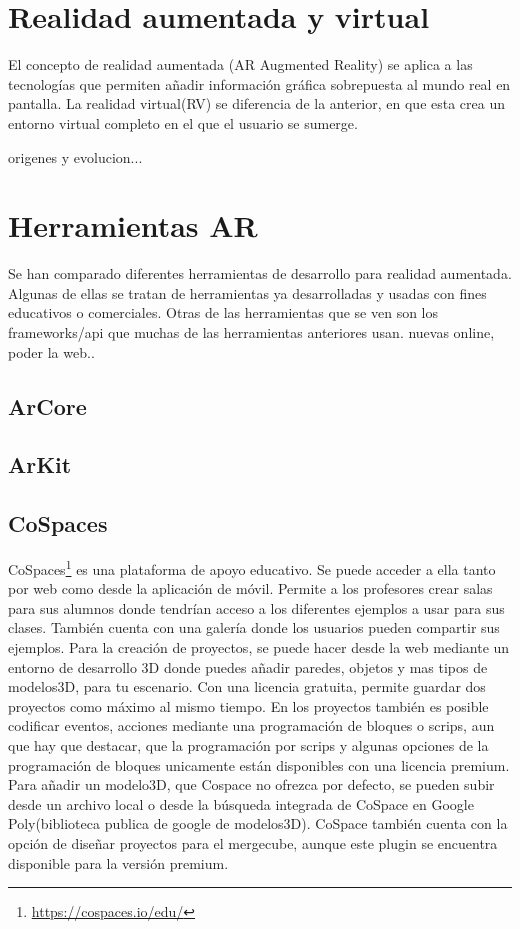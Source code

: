 

\section{Realidad aumentada y virtual}
El concepto de realidad aumentada (AR Augmented Reality) se aplica a las tecnologías que permiten añadir información gráfica sobrepuesta al mundo real en pantalla.
La realidad virtual(RV) se diferencia de la anterior, en que esta crea un entorno virtual completo en el que el usuario se sumerge.
 
origenes y evolucion...




\section{Herramientas AR}
Se han comparado diferentes herramientas de desarrollo para realidad aumentada. Algunas de ellas se tratan de herramientas ya desarrolladas y usadas con fines educativos o comerciales. Otras de las herramientas que se ven son los frameworks/api que muchas de las herramientas anteriores usan.
nuevas online, poder la web.. 

\subsection{ArCore}

\subsection{ArKit}
\subsection{CoSpaces} CoSpaces\footnote{\url{https://cospaces.io/edu/}} es una plataforma de apoyo educativo. Se puede acceder a ella tanto por web como desde la aplicación de móvil. Permite a los profesores crear salas para sus alumnos donde tendrían acceso a los diferentes ejemplos a usar para sus clases. También cuenta con una galería donde los usuarios pueden compartir sus ejemplos.
Para la creación de proyectos, se puede hacer desde la web mediante un entorno de desarrollo 3D donde puedes añadir paredes, objetos y mas tipos de modelos3D, para tu escenario. Con una licencia gratuita, permite guardar dos proyectos como máximo al mismo tiempo. En los proyectos también es posible codificar eventos, acciones mediante una programación de bloques o scrips, aun que hay que destacar, que la programación por scrips y algunas opciones de la programación de bloques unicamente están disponibles con una licencia premium. Para añadir un modelo3D, que Cospace no ofrezca por defecto, se pueden subir desde un archivo local o desde la búsqueda integrada de CoSpace en Google Poly(biblioteca publica de google de modelos3D).
CoSpace también cuenta con la opción de diseñar proyectos para el mergecube, aunque este plugin se encuentra disponible para la versión premium.

